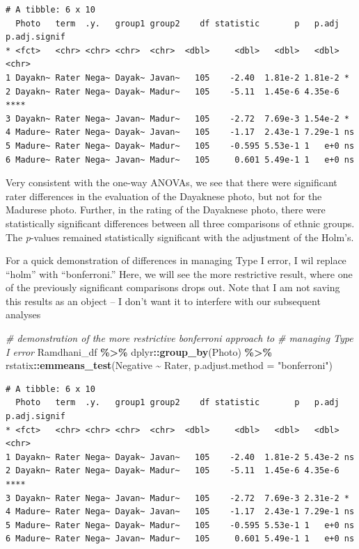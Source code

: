 \documentclass[
  11pt,
]{book}
\newenvironment{Shaded}{\begin{snugshade}}{\end{snugshade}}
\newcommand{\AttributeTok}[1]{\textcolor[rgb]{0.27,0.27,0.27}{#1}}
\newcommand{\CommentTok}[1]{\textcolor[rgb]{0.37,0.37,0.37}{\textit{#1}}}
\newcommand{\FunctionTok}[1]{\textcolor[rgb]{0.27,0.27,0.27}{\textbf{#1}}}
\newcommand{\NormalTok}[1]{#1}
\newcommand{\SpecialCharTok}[1]{\textcolor[rgb]{0.43,0.43,0.43}{\textbf{#1}}}
\newcommand{\StringTok}[1]{\textcolor[rgb]{0.5,0.5,0.5}{#1}}
\begin{document}
\begin{verbatim}
# A tibble: 6 x 10
  Photo   term  .y.   group1 group2    df statistic       p   p.adj p.adj.signif
* <fct>   <chr> <chr> <chr>  <chr>  <dbl>     <dbl>   <dbl>   <dbl> <chr>       
1 Dayakn~ Rater Nega~ Dayak~ Javan~   105    -2.40  1.81e-2 1.81e-2 *           
2 Dayakn~ Rater Nega~ Dayak~ Madur~   105    -5.11  1.45e-6 4.35e-6 ****        
3 Dayakn~ Rater Nega~ Javan~ Madur~   105    -2.72  7.69e-3 1.54e-2 *           
4 Madure~ Rater Nega~ Dayak~ Javan~   105    -1.17  2.43e-1 7.29e-1 ns          
5 Madure~ Rater Nega~ Dayak~ Madur~   105    -0.595 5.53e-1 1   e+0 ns          
6 Madure~ Rater Nega~ Javan~ Madur~   105     0.601 5.49e-1 1   e+0 ns          
\end{verbatim}

Very consistent with the one-way ANOVAs, we see that there were significant rater differences in the evaluation of the Dayaknese photo, but not for the Madurese photo. Further, in the rating of the Dayaknese photo, there were statistically significant differences between all three comparisons of ethnic groups. The \emph{p}-values remained statistically significant with the adjustment of the Holm's.

For a quick demonstration of differences in managing Type I error, I wil replace ``holm'' with ``bonferroni.'' Here, we will see the more restrictive result, where one of the previously significant comparisons drops out. Note that I am not saving this results as an object -- I don't want it to interfere with our subsequent analyses

\begin{Shaded}
\begin{Highlighting}[]
\CommentTok{\# demonstration of the more restrictive bonferroni approach to}
\CommentTok{\# managing Type I error}
\NormalTok{Ramdhani\_df }\SpecialCharTok{\%\textgreater{}\%}
\NormalTok{    dplyr}\SpecialCharTok{::}\FunctionTok{group\_by}\NormalTok{(Photo) }\SpecialCharTok{\%\textgreater{}\%}
\NormalTok{    rstatix}\SpecialCharTok{::}\FunctionTok{emmeans\_test}\NormalTok{(Negative }\SpecialCharTok{\textasciitilde{}}\NormalTok{ Rater, }\AttributeTok{p.adjust.method =} \StringTok{"bonferroni"}\NormalTok{)}
\end{Highlighting}
\end{Shaded}

\begin{verbatim}
# A tibble: 6 x 10
  Photo   term  .y.   group1 group2    df statistic       p   p.adj p.adj.signif
* <fct>   <chr> <chr> <chr>  <chr>  <dbl>     <dbl>   <dbl>   <dbl> <chr>       
1 Dayakn~ Rater Nega~ Dayak~ Javan~   105    -2.40  1.81e-2 5.43e-2 ns          
2 Dayakn~ Rater Nega~ Dayak~ Madur~   105    -5.11  1.45e-6 4.35e-6 ****        
3 Dayakn~ Rater Nega~ Javan~ Madur~   105    -2.72  7.69e-3 2.31e-2 *           
4 Madure~ Rater Nega~ Dayak~ Javan~   105    -1.17  2.43e-1 7.29e-1 ns          
5 Madure~ Rater Nega~ Dayak~ Madur~   105    -0.595 5.53e-1 1   e+0 ns          
6 Madure~ Rater Nega~ Javan~ Madur~   105     0.601 5.49e-1 1   e+0 ns          
\end{verbatim}
\end{document}

